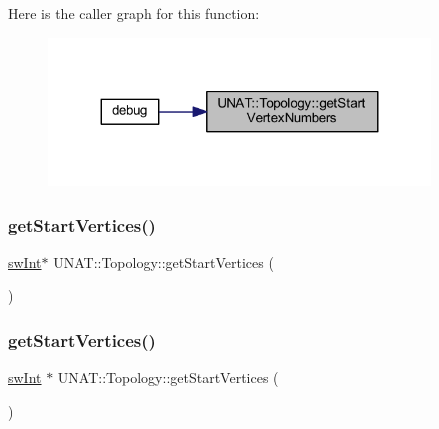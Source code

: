 Here is the caller graph for this function\+:
\nopagebreak
\begin{figure}[H]
\begin{center}
\leavevmode
\includegraphics[width=287pt]{classUNAT_1_1Topology_a331046e1e8c64d3e579ff940855e6908_icgraph}
\end{center}
\end{figure}
\mbox{\label{classUNAT_1_1Topology_aa1de517c63444c3fd56d97fc99df2294}} 
\subsubsection{\texorpdfstring{getStartVertices()}{getStartVertices()}\hspace{0.1cm}{\footnotesize\ttfamily [1/3]}}
{\footnotesize\ttfamily \mbox{\hyperlink{include_2swMacro_8h_a113cf5f6b5377cdf3fac6aa4e443e9aa}{sw\+Int}}$\ast$ U\+N\+A\+T\+::\+Topology\+::get\+Start\+Vertices (\begin{DoxyParamCaption}{ }\end{DoxyParamCaption})}

\mbox{\label{classUNAT_1_1Topology_ade1737d852cde9f4d691b325dfd20c36}} 
\subsubsection{\texorpdfstring{getStartVertices()}{getStartVertices()}\hspace{0.1cm}{\footnotesize\ttfamily [2/3]}}
{\footnotesize\ttfamily \mbox{\hyperlink{include_2swMacro_8h_a113cf5f6b5377cdf3fac6aa4e443e9aa}{sw\+Int}} $\ast$ U\+N\+A\+T\+::\+Topology\+::get\+Start\+Vertices (\begin{DoxyParamCaption}{ }\end{DoxyParamCaption})}

